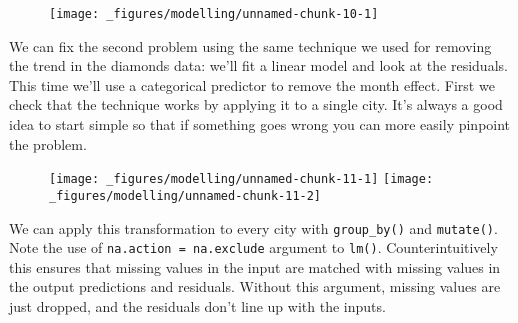 \begin{figure}[H]
  \texttt{[image: \_figures/modelling/unnamed-chunk-10-1]}
\end{figure}

We can fix the second problem using the same technique we used for
removing the trend in the diamonds data: we'll fit a linear model and
look at the residuals. This time we'll use a categorical predictor to
remove the month effect. First we check that the technique works by
applying it to a single city. It's always a good idea to start simple so
that if something goes wrong you can more easily pinpoint the problem.

\begin{Shaded}
\end{Shaded}

\begin{figure}[H]
  \texttt{[image: \_figures/modelling/unnamed-chunk-11-1]}%
  \texttt{[image: \_figures/modelling/unnamed-chunk-11-2]}
\end{figure}

We can apply this transformation to every city with \texttt{group\_by()}
and \texttt{mutate()}. Note the use of \texttt{na.action\ =\ na.exclude}
argument to \texttt{lm()}. Counterintuitively this ensures that missing
values in the input are matched with missing values in the output
predictions and residuals. Without this argument, missing values are
just dropped, and the residuals don't line up with the inputs.

